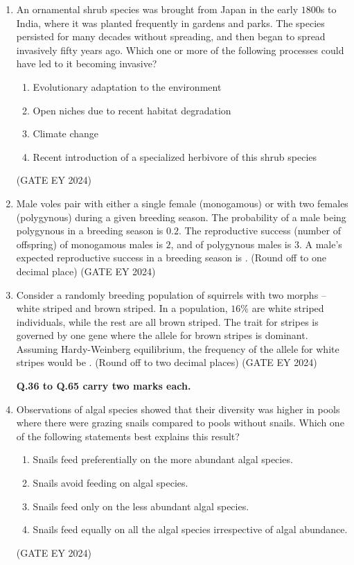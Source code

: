 \documentclass[journal]{IEEEtran}
\begin{document}
\begin{enumerate}
\item An ornamental shrub species was brought from Japan in the early $1800$s to India, where it was planted frequently in gardens and parks. The species persisted for many decades without spreading, and then began to spread invasively fifty years ago. Which one or more of the following processes could have led to it becoming invasive?
    \begin{enumerate}
        \item Evolutionary adaptation to the environment
        \item Open niches due to recent habitat degradation
        \item Climate change
        \item Recent introduction of a specialized herbivore of this shrub species
    \end{enumerate}
\hfill{(GATE EY 2024)}

\item Male voles pair with either a single female (monogamous) or with two females (polygynous) during a given breeding season. The probability of a male being polygynous in a breeding season is $0.2$. The reproductive success (number of offspring) of monogamous males is $2$, and of polygynous males is $3$. A male's expected reproductive success in a breeding season is \underline{\hspace{3cm}}. (Round off to one decimal place)
\hfill{(GATE EY 2024)}

\item Consider a randomly breeding population of squirrels with two morphs -- white striped and brown striped. In a population, $16\%$ are white striped individuals, while the rest are all brown striped. The trait for stripes is governed by one gene where the allele for brown stripes is dominant. Assuming Hardy-Weinberg equilibrium, the frequency of the allele for white stripes would be \underline{\hspace{3cm}}. (Round off to two decimal places)
\hfill{(GATE EY 2024)}

\textbf{Q.36 to Q.65 carry two marks each.}

\item Observations of algal species showed that their diversity was higher in pools where there were grazing snails compared to pools without snails. Which one of the following statements best explains this result?
    \begin{enumerate}
        \item Snails feed preferentially on the more abundant algal species.
        \item Snails avoid feeding on algal species.
        \item Snails feed only on the less abundant algal species.
        \item Snails feed equally on all the algal species irrespective of algal abundance.
    \end{enumerate}
\hfill{(GATE EY 2024)}


\end{enumerate}
\end{document}
